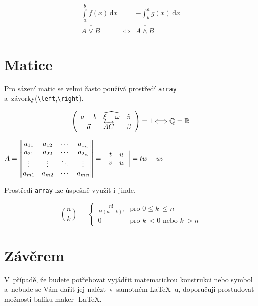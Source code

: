 \documentclass[11pt,a4paper,twocolumn]{article}
\theoremstyle{definition}
\theoremstyle{plain}
\begin{document}
\begin{eqnarray}
\int\limits_{a}^{b}f(x)\,\mathrm{d}x & = & -\int_b^ag(x)\,\mathrm{d}x\\
\overline{\overline{A\vee B}} & \Leftrightarrow & \overline{\overline{A}\wedge \overline{B}}\ \end{eqnarray}

\section{Matice}

Pro sázení matic se velmi často používá prostředí \verb|array| a~závorky(\verb|\left|,\verb|\right|).


$$ \left(
\begin{array}{c l l}
a+b & \widehat{\xi +\omega} & \hat{\pi}  \\
\vec{a} & \overleftrightarrow{AC} & \beta  
\end{array}\right) 
= 1 \Longleftrightarrow
\mathbb{Q} = \mathbb{R}
$$


$
{A = \left\|
 \begin{matrix}
  a_{11} & a_{12} & \cdots & a_{1_n} \\
  a_{21} & a_{22} & \cdots & a_{2_n} \\
  \vdots  & \vdots  & \ddots & \vdots  \\
  a_{m1} & a_{m2} & \cdots & a_{mn} 
 \end{matrix}\right\| =  
  \left|
\begin{array}{c l}
t & u \\
v & w
\end{array}\right| =tw-uv}\\\\
$

Prostředí \verb|array| lze úspešně využít i~jinde.

$$
\binom{n}{k} = \begin{cases}
\ \frac{n!}{k!(n - k)!} & \text{pro } 0 \leq k~\leq n\\
\ 0 & \text{pro } k~< 0 \text{ nebo } k~> n
\end{cases}
$$


\section{Závěrem}

V~případě, že budete potřebovat vyjádřit matematickou konstrukci nebo symbol a~nebude se Vám dařit jej nalézt~v~samotném \LaTeX~u, doporučuji prostudovat možnosti balíku maker \AmS-\LaTeX.
\end{document}
